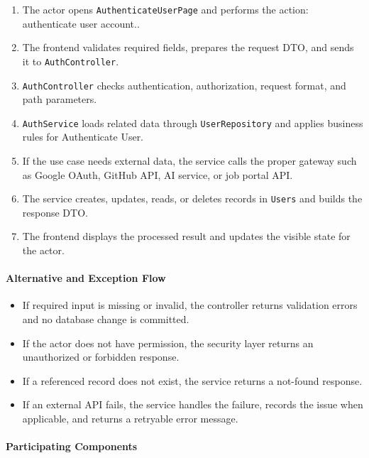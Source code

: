 \begin{enumerate}
    \item The actor opens \texttt{AuthenticateUserPage} and performs the action: authenticate user account..
    \item The frontend validates required fields, prepares the request DTO, and sends it to \texttt{AuthController}.
    \item \texttt{AuthController} checks authentication, authorization, request format, and path parameters.
    \item \texttt{AuthService} loads related data through \texttt{UserRepository} and applies business rules for Authenticate User.
    \item If the use case needs external data, the service calls the proper gateway such as Google OAuth, GitHub API, AI service, or job portal API.
    \item The service creates, updates, reads, or deletes records in \texttt{Users} and builds the response DTO.
    \item The frontend displays the processed result and updates the visible state for the actor.
\end{enumerate}

\paragraph{Alternative and Exception Flow}

\begin{itemize}
    \item If required input is missing or invalid, the controller returns validation errors and no database change is committed.
    \item If the actor does not have permission, the security layer returns an unauthorized or forbidden response.
    \item If a referenced record does not exist, the service returns a not-found response.
    \item If an external API fails, the service handles the failure, records the issue when applicable, and returns a retryable error message.
\end{itemize}

\paragraph{Participating Components}

